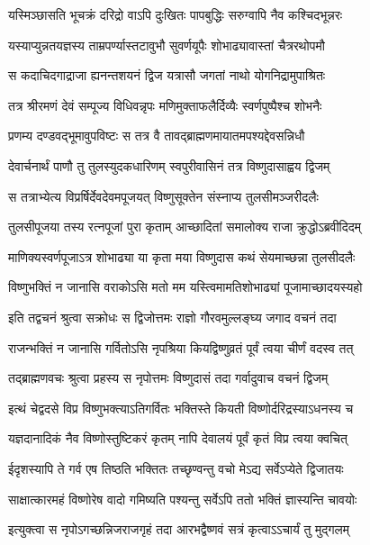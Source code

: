 \twolineshloka
{यस्मिञ्छासति भूचक्रं दरिद्रो वाऽपि दुःखितः}
{पापबुद्धिः सरुग्वापि नैव कश्चिदभून्नरः} %

\twolineshloka
{यस्याप्युन्नतयज्ञस्य ताम्रपर्ण्यास्तटावुभौ}
{सुवर्णयूपैः शोभाढ्यावास्तां चैत्ररथोपमौ} %

\twolineshloka
{स कदाचिदगाद्राजा ह्यनन्तशयनं द्विज}
{यत्रासौ जगतां नाथो योगनिद्रामुपाश्रितः} %

\twolineshloka
{तत्र श्रीरमणं देवं सम्पूज्य विधिवन्नृपः}
{मणिमुक्ताफलैर्दिव्यैः स्वर्णपुष्पैश्च शोभनैः} %

\twolineshloka
{प्रणम्य दण्डवद्भूमावुपविष्टः स तत्र वै}
{तावद्ब्राह्मणमायातमपश्यद्देवसन्निधौ} %

\twolineshloka
{देवार्चनार्थं पाणौ तु तुलस्युदकधारिणम्}
{स्वपुरीवासिनं तत्र विष्णुदासाह्वय द्विजम्} %

\twolineshloka
{स तत्राभ्येत्य विप्रर्षिर्देवदेवमपूजयत्}
{विष्णुसूक्तेन संस्नाप्य तुलसीमञ्जरीदलैः} %

\twolineshloka
{तुलसीपूजया तस्य रत्नपूजां पुरा कृताम्}
{आच्छादितां समालोक्य राजा क्रुद्धोऽब्रवीदिदम्} %


\twolineshloka
{माणिक्यस्वर्णपूजाऽत्र शोभाढ्या या कृता मया}
{विष्णुदास कथं सेयमाच्छन्ना तुलसीदलैः} %

\twolineshloka
{विष्णुभक्तिं न जानासि वराकोऽसि मतो मम}
{यस्त्विमामतिशोभाढ्यां पूजामाच्छादयस्यहो} %

\twolineshloka
{इति तद्वचनं श्रुत्वा सक्रोधः स द्विजोत्तमः}
{राज्ञो गौरवमुल्लङ्घ्य जगाद वचनं तदा} %


\twolineshloka
{राजन्भक्तिं न जानासि गर्वितोऽसि नृपश्रिया}
{कियद्विष्णुव्रतं पूर्वं त्वया चीर्णं वदस्व तत्} %


\twolineshloka
{तद्ब्राह्मणवचः श्रुत्वा प्रहस्य स नृपोत्तमः}
{विष्णुदासं तदा गर्वादुवाच वचनं द्विजम्} %


\twolineshloka
{इत्थं चेद्वदसे विप्र विष्णुभक्त्याऽतिगर्वितः}
{भक्तिस्ते कियती विष्णोर्दरिद्रस्याऽधनस्य च} %


\twolineshloka
{यज्ञदानादिकं नैव विष्णोस्तुष्टिकरं कृतम्}
{नापि देवालयं पूर्वं कृतं विप्र त्वया क्वचित्} %

\twolineshloka
{ईदृशस्यापि ते गर्व एष तिष्ठति भक्तितः}
{तच्छृण्वन्तु वचो मेऽद्य सर्वेऽप्येते द्विजातयः} %

\twolineshloka
{साक्षात्कारमहं विष्णोरेष वादो गमिष्यति}
{पश्यन्तु सर्वेऽपि ततो भक्तिं ज्ञास्यन्ति चावयोः} %


\twolineshloka
{इत्युक्त्वा स नृपोऽगच्छन्निजराजगृहं तदा}
{आरभद्वैष्णवं सत्रं कृत्वाऽऽचार्यं तु मुद्गलम्} %


